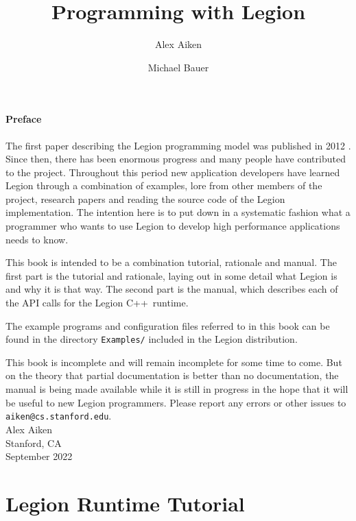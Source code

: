 \documentclass[11pt]{book}
\newcommand{\legionbook}[1]{{\tt Examples/#1}}
\newcommand{\Cpp}{C++}
\begin{document}
\title{Programming with Legion}
\author{Alex Aiken \and Michael Bauer}

\maketitle

\subsection*{Preface}

The first paper describing the Legion programming model
was published in 2012 \cite{Legion12}.  Since then, there has been
enormous progress and many people have contributed to
the project.  Throughout this period new application developers have
learned Legion through a combination of examples, lore from other
members of the project, research papers and reading the source code of
the Legion implementation.  The intention here is to put down in 
a systematic fashion what a programmer who wants to use
Legion to develop high performance applications needs to know.

This book is intended to be a combination tutorial, rationale and
manual.  The first part is the tutorial and rationale, laying out in some
detail what Legion is and why it is that way.  The second part is the manual, which describes
each of the API calls for the Legion \Cpp\ runtime.

The example programs and configuration files referred to in this book can be found in the directory
\legionbook{} included in the Legion distribution.

This book is incomplete and will remain incomplete for
some time to come.  But on the theory that partial documentation is better than no
documentation, the manual is being made available while it is
still in progress in the hope that it will be useful to new Legion
programmers.  Please report any errors or other issues to {\tt
  aiken@cs.stanford.edu}. \\[2in] Alex Aiken\\ Stanford, CA \\
September 2022

\tableofcontents

\part{Legion Runtime Tutorial}






%

%

%



\end{document}

